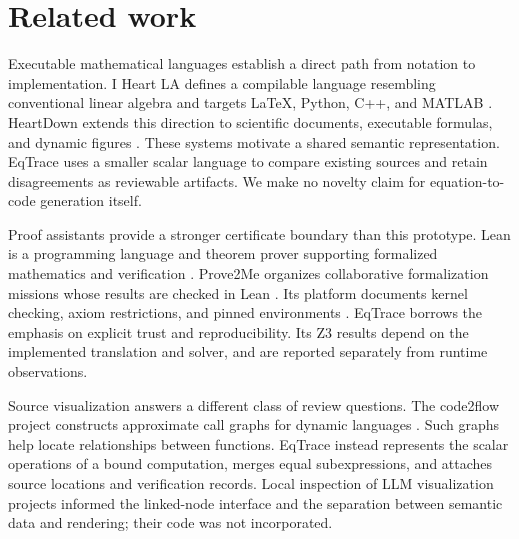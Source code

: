 \section{Related work}
\label{sec:related}
Executable mathematical languages establish a direct path from notation to implementation. I Heart LA defines a compilable language resembling conventional linear algebra and targets LaTeX, Python, C++, and MATLAB \citep{LiIHeartLA2021}. HeartDown extends this direction to scientific documents, executable formulas, and dynamic figures \citep{LiHeartDown2022}. These systems motivate a shared semantic representation. EqTrace uses a smaller scalar language to compare existing sources and retain disagreements as reviewable artifacts. We make no novelty claim for equation-to-code generation itself.

Proof assistants provide a stronger certificate boundary than this prototype. Lean is a programming language and theorem prover supporting formalized mathematics and verification \citep{DeMouraLean2021}. Prove2Me organizes collaborative formalization missions whose results are checked in Lean \citep{ChenProve2Me2026}. Its platform documents kernel checking, axiom restrictions, and pinned environments \citep{Prove2MeAbout2026}. EqTrace borrows the emphasis on explicit trust and reproducibility. Its Z3 results depend on the implemented translation and solver, and are reported separately from runtime observations.

Source visualization answers a different class of review questions. The code2flow project constructs approximate call graphs for dynamic languages \citep{RogowskiCode2flow2026}. Such graphs help locate relationships between functions. EqTrace instead represents the scalar operations of a bound computation, merges equal subexpressions, and attaches source locations and verification records. Local inspection of LLM visualization projects informed the linked-node interface and the separation between semantic data and rendering; their code was not incorporated.
